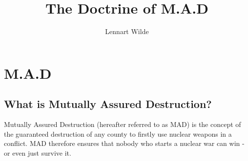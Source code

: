 \documentclass[12pt,twoside,a4paper]{scrartcl}
\author{Lennart Wilde}
\title{The Doctrine of M.A.D}
\begin{document}
    \maketitle
    \newpage

    \section{M.A.D}
    \subsection{What is Mutually Assured Destruction?}
        
        Mutually Assured Destruction (hereafter referred to as MAD) is the concept of the guaranteed destruction of any county to firstly use nuclear weapons in a conflict. MAD therefore ensures that nobody who starts a nuclear war can win - or even just survive it.
        
\end{document}
